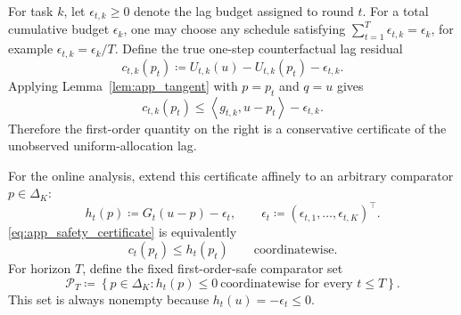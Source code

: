 For task $k$, let $\epsilon_{t,k}\ge 0$ denote the lag budget assigned to round $t$. For a total cumulative budget $\epsilon_k$, one may choose any schedule satisfying $\sum_{t=1}^T\epsilon_{t,k}=\epsilon_k$, for example $\epsilon_{t,k}=\epsilon_k/T$. Define the true one-step counterfactual lag residual
\begin{equation}
    c_{t,k}(p_t)
    \coloneqq
    U_{t,k}(u)-U_{t,k}(p_t)-\epsilon_{t,k}.
    \label{eq:app_true_residual}
\end{equation}
Applying Lemma~\ref{lem:app_tangent} with $p=p_t$ and $q=u$ gives
\begin{equation}
    c_{t,k}(p_t)
    \le
    \left\langle g_{t,k},u-p_t\right\rangle-\epsilon_{t,k}.
    \label{eq:app_safety_certificate}
\end{equation}
Therefore the first-order quantity on the right is a conservative certificate of the unobserved uniform-allocation lag.

For the online analysis, extend this certificate affinely to an arbitrary comparator $p\in\Delta_K$:
\begin{equation}
    h_t(p)
    \coloneqq
    G_t(u-p)-\epsilon_t,
    \qquad
    \epsilon_t
    \coloneqq
    (\epsilon_{t,1},\ldots,\epsilon_{t,K})^\top.
    \label{eq:app_affine_residual}
\end{equation}
\eqref{eq:app_safety_certificate} is equivalently
\begin{equation}
    c_t(p_t)\le h_t(p_t)
    \qquad\text{coordinatewise}.
    \label{eq:app_true_vs_linearized}
\end{equation}
For horizon $T$, define the fixed first-order-safe comparator set
\begin{equation}
    \mathcal{P}_T
    \coloneqq
    \left\{
        p\in\Delta_K:
        h_t(p)\le 0\ \text{coordinatewise for every }t\le T
    \right\}.
    \label{eq:app_comparator_set}
\end{equation}
This set is always nonempty because $h_t(u)=-\epsilon_t\le 0$.


